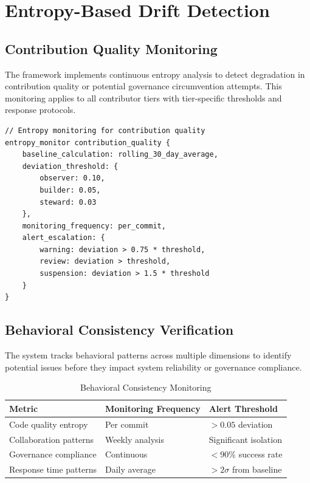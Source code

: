 \section{Entropy-Based Drift Detection}

\subsection{Contribution Quality Monitoring}

The framework implements continuous entropy analysis to detect degradation in contribution quality or potential governance circumvention attempts. This monitoring applies to all contributor tiers with tier-specific thresholds and response protocols.

\begin{lstlisting}[style=riftlang, language=rift]
// Entropy monitoring for contribution quality
entropy_monitor contribution_quality {
    baseline_calculation: rolling_30_day_average,
    deviation_threshold: {
        observer: 0.10,
        builder: 0.05,
        steward: 0.03
    },
    monitoring_frequency: per_commit,
    alert_escalation: {
        warning: deviation > 0.75 * threshold,
        review: deviation > threshold,
        suspension: deviation > 1.5 * threshold
    }
}
\end{lstlisting}

\subsection{Behavioral Consistency Verification}

The system tracks behavioral patterns across multiple dimensions to identify potential issues before they impact system reliability or governance compliance.

\begin{table}[h]
\centering
\begin{tabular}{|l|l|l|}
\hline
\textbf{Metric} & \textbf{Monitoring Frequency} & \textbf{Alert Threshold} \\
\hline
Code quality entropy & Per commit & $> 0.05$ deviation \\
Collaboration patterns & Weekly analysis & Significant isolation \\
Governance compliance & Continuous & $< 90\%$ success rate \\
Response time patterns & Daily average & $> 2\sigma$ from baseline \\
\hline
\end{tabular}
\caption{Behavioral Consistency Monitoring}
\label{tab:behavioral_monitoring}
\end{table}

